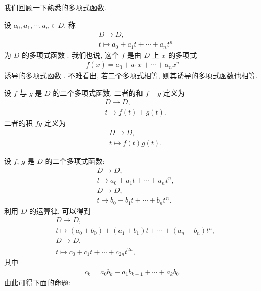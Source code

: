\subsection*{\RootsOfPolynomials}
\markright{\RootsOfPolynomials}

我们回顾一下熟悉的多项式函数.

\begin{definition}
    设 $a_0, a_1, \cdots, a_n \in D$. 称
    \begin{align*}
         & D \to D, \tag*{$f \colon$}               \\
         & t \mapsto a_0 + a_1 t + \cdots + a_n t^n
    \end{align*}
    为 $D$ 的多项式函数 . 我们也说, 这个 $f$ 是由 $D$ 上 $x$ 的多项式
    \begin{align*}
        f(x) = a_0 + a_1 x + \cdots + a_n x^n
    \end{align*}
    诱导的多项式函数 . 不难看出, 若二个多项式相等, 则其诱导的多项式函数也相等.
\end{definition}

\begin{definition}
    设 $f$ 与 $g$ 是 $D$ 的二个多项式函数. 二者的和 $f+g$ 定义为
    \begin{align*}
         & D \to D, \tag*{$f+g \colon$} \\
         & t \mapsto f(t) + g(t).
    \end{align*}
    二者的积 $fg$ 定义为
    \begin{align*}
         & D \to D, \tag*{$fg \colon$} \\
         & t \mapsto f(t) g(t).
    \end{align*}
\end{definition}

设 $f$, $g$ 是 $D$ 的二个多项式函数:
\begin{align*}
     & D \to D, \tag*{$f \colon$}                \\
     & t \mapsto a_0 + a_1 t + \cdots + a_n t^n, \\
     & D \to D, \tag*{$g \colon$}                \\
     & t \mapsto b_0 + b_1 t + \cdots + b_n t^n.
\end{align*}
利用 $D$ 的运算律, 可以得到
\begin{align*}
     & D \to D, \tag*{$f+g \colon$}                                      \\
     & t \mapsto (a_0 + b_0) + (a_1 + b_1) t + \cdots + (a_n + b_n) t^n, \\
     & D \to D, \tag*{$fg \colon$}                                       \\
     & t \mapsto c_0 + c_1 t + \cdots + c_{2n} t^{2n},
\end{align*}
其中
\begin{align*}
    c_k = a_0 b_k + a_1 b_{k-1} + \cdots + a_k b_0.
\end{align*}
由此可得下面的命题:

